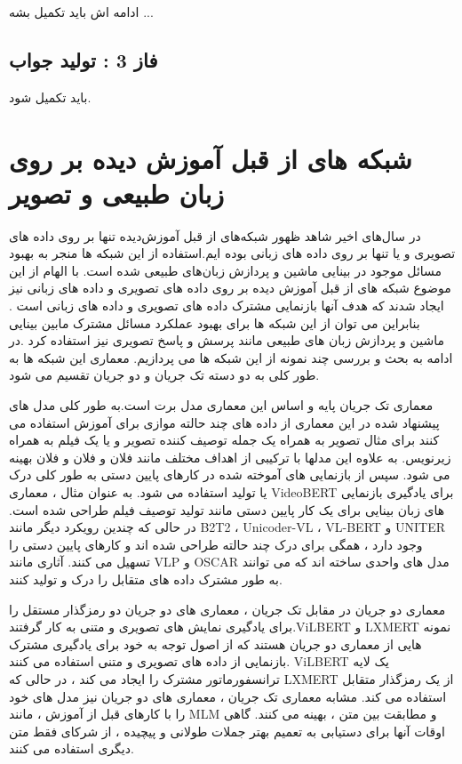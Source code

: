   ادامه اش باید تکمیل بشه ... 

\subsection{فاز 3 : تولید جواب}
باید تکمیل شود.

\section{شبکه های از قبل آموزش دیده بر روی  زبان طبیعی و تصویر}
در سال‌های اخیر شاهد ظهور شبکه‌های از قبل آموزش‌دیده تنها بر روی داده های تصویری و یا تنها بر روی داده های زبانی بوده ایم.استفاده از این شبکه ها منجر به بهبود مسائل موجود در بینایی ماشین و پردازش زبان‌های طبیعی شده است. با الهام از این موضوع شبکه های از قبل آموزش دیده بر روی داده های تصویری و داده های زبانی نیز ایجاد شدند که هدف آنها بازنمایی مشترک داده های تصویری و داده های زبانی است . بنابراین می توان از این شبکه ها برای بهبود عملکرد مسائل مشترک مابین بینایی ماشین و پردازش زبان های طبیعی مانند پرسش و پاسخ تصویری نیز استفاده کرد .در ادامه به بحث و بررسی چند نمونه از این شبکه ها می پردازیم. معماری این شبکه ها به طور کلی به دو دسته تک جریان و دو جریان تقسیم می شود.

معماری تک جریان 
پایه و اساس این معماری مدل برت است.به طور کلی مدل های پیشنهاد شده در این معماری از داده های چند حالته موازی برای آموزش استفاده می کنند برای مثال تصویر به همراه یک جمله توصیف کننده تصویر و یا یک فیلم به همراه زیرنویس. به علاوه این مدلها با ترکیبی از اهداف مختلف مانند فلان و فلان و فلان بهینه می شود. سپس از بازنمایی های آموخته شده در کارهای پایین دستی به طور کلی درک یا تولید استفاده می شود. به عنوان مثال ، معماری VideoBERT برای یادگیری بازنمایی های زبان بینایی برای یک کار پایین دستی مانند تولید توصیف فیلم طراحی شده است. در حالی که چندین رویکرد دیگر مانند B2T2 ، Unicoder-VL ، VL-BERT و UNITER وجود دارد ، همگی برای درک چند حالته طراحی شده اند و کارهای پایین دستی را تسهیل می کنند. آثاری مانند VLP و OSCAR مدل های واحدی ساخته اند که می توانند به طور مشترک داده های متقابل را درک و تولید کنند.

معماری دو جریان
در مقابل تک جریان ، معماری های دو جریان دو رمزگذار مستقل را برای یادگیری نمایش های تصویری و متنی به کار گرفتند.ViLBERT و LXMERT نمونه هایی از معماری دو جریان هستند که از اصول توجه به خود برای یادگیری مشترک بازنمایی از داده های تصویری و متنی استفاده می کنند. ViLBERT یک لایه ترانسفورماتور مشترک را ایجاد می کند ، در حالی که LXMERT از یک رمزگذار متقابل استفاده می کند. مشابه معماری تک جریان ، معماری های دو جریان نیز مدل های خود را با کارهای قبل از آموزش ، مانند MLM و مطابقت بین متن ، بهینه می کنند. گاهی اوقات آنها برای دستیابی به تعمیم بهتر جملات طولانی و پیچیده ، از شرکای فقط متن دیگری استفاده می کنند.

